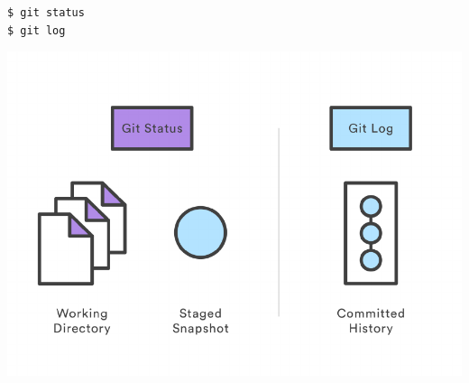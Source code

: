 \documentclass{article}
\begin{document}
\begin{lstlisting}
$ git status
$ git log
\end{lstlisting}

\begin{center}
\includegraphics[scale=0.5]{figures/05.pdf}
\end{center}
\end{document}
